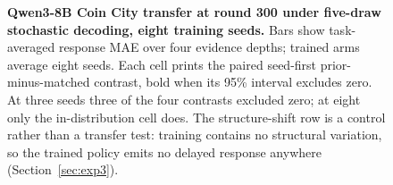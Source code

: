 \begin{figure}[!ht]
{%
}
\caption{\textbf{Qwen3-8B Coin City transfer at round 300 under five-draw
stochastic decoding, eight training seeds.} Bars show task-averaged response MAE
over four evidence depths; trained arms average eight seeds. Each cell prints the
paired seed-first prior-minus-matched contrast, bold when its 95\% interval
excludes zero. At three seeds three of the four contrasts excluded zero; at eight
only the in-distribution cell does. The structure-shift row is a control rather than
a transfer test: training contains no structural variation, so the trained policy
emits no delayed response anywhere (Section~\ref{sec:exp3}).}
\label{fig:exp3-transfer-results}
\vspace{10pt}
\end{figure}
